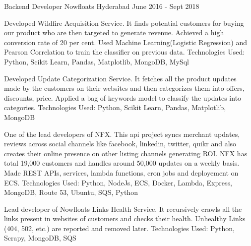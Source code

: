 \begin{cventries}
  \cventry
    {Backend Developer} %
    {Nowfloats} %
    {Hyderabad} %
    {June 2016 - Sept 2018} %
    {
      \begin{cvitems} %
        \item {Developed Wildfire Acquisition Service. It finds potential customers for buying our product who are then targeted to generate revenue. Achieved a high conversion rate of 20 per cent. Used Machine Learning(Logistic Regression) and Pearson Correlation to train the classifier on previous data. Technologies Used: Python, Scikit Learn, Pandas, Matplotlib, MongoDB, MySql  }
        \item {Developed Update Categorization Service. It fetches all the product updates made by the customers on their websites and then categorizes them into offers, discounts, price. Applied a bag of keywords model to classify the updates into categories. Technologies Used: Python, Scikit Learn, Pandas, Matplotlib, MongoDB  }
        \item {One of the lead developers of NFX. This api project syncs merchant updates, reviews across social channels like facebook, linkedin, twitter, quikr and also creates their online presence on other listing channels generating ROI. NFX has total 19,000 customers and handles around 50,000 updates on a weekly basis. Made REST APIs, services, lambda functions, cron jobs and deployement on ECS. Technologies Used: Python, NodeJs, ECS, Docker, Lambda, Express, MongoDB, Route 53, Ubuntu, SQS, Python}
        \item {Lead developer of Nowfloats Links Health Service. It recursively crawls all the links present in websites of customers and checks their health. Unhealthy Links (404, 502, etc.) are reported and removed later. Technologies Used: Python, Scrapy, MongoDB, SQS  }
      \end{cvitems}
    }

\end{cventries}
